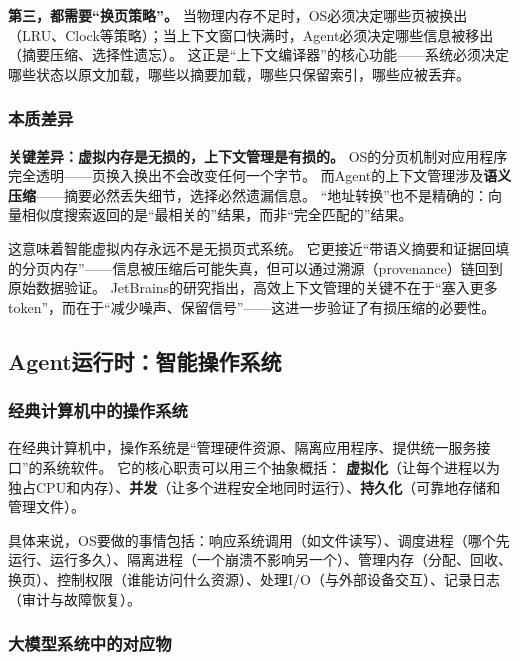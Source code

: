 \textbf{第三，都需要``换页策略''。}
当物理内存不足时，OS必须决定哪些页被换出（LRU、Clock等策略）；当上下文窗口快满时，Agent必须决定哪些信息被移出（摘要压缩、选择性遗忘）。
这正是``上下文编译器''的核心功能——系统必须决定哪些状态以原文加载，哪些以摘要加载，哪些只保留索引，哪些应被丢弃\cite{contextcompiler2025}。

\subsubsection{本质差异}

\textbf{关键差异：虚拟内存是\textbf{无损}的，上下文管理是\textbf{有损}的。}
OS的分页机制对应用程序完全透明——页换入换出不会改变任何一个字节。
而Agent的上下文管理涉及\textbf{语义压缩}——摘要必然丢失细节，选择必然遗漏信息。
``地址转换''也不是精确的：向量相似度搜索返回的是``最相关的''结果，而非``完全匹配的''结果。

这意味着智能虚拟内存永远不是无损页式系统。
它更接近``带语义摘要和证据回填的分页内存''——信息被压缩后可能失真，但可以通过溯源（provenance）链回到原始数据验证。
JetBrains的研究指出，高效上下文管理的关键不在于``塞入更多token''，而在于``减少噪声、保留信号''\cite{jetbrains2025context}——这进一步验证了有损压缩的必要性。

\subsection{Agent运行时：智能操作系统}
\label{sec:agent}

\subsubsection{经典计算机中的操作系统}

在经典计算机中，操作系统是``管理硬件资源、隔离应用程序、提供统一服务接口''的系统软件\cite{ostep_2023}。
它的核心职责可以用三个抽象概括：
\textbf{虚拟化}（让每个进程以为独占CPU和内存）、\textbf{并发}（让多个进程安全地同时运行）、\textbf{持久化}（可靠地存储和管理文件）。

具体来说，OS要做的事情包括：响应系统调用（如文件读写）、调度进程（哪个先运行、运行多久）、隔离进程（一个崩溃不影响另一个）、管理内存（分配、回收、换页）、控制权限（谁能访问什么资源）、处理I/O（与外部设备交互）、记录日志（审计与故障恢复）。

\subsubsection{大模型系统中的对应物}

